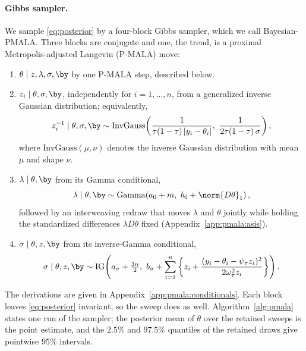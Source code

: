\paragraph{Gibbs sampler.} We sample \eqref{eq:posterior} by a four-block Gibbs sampler, which we call Bayesian-PMALA. Three blocks are conjugate and one, the trend, is a proximal Metropolis-adjusted Langevin (P-MALA) move:
\begin{enumerate}
    \item $\theta \mid z, \lambda, \sigma, \by$ by one P-MALA step, described below.
    \item $z_i \mid \theta, \sigma, \by$, independently for $i = 1, \ldots, n$, from a generalized inverse Gaussian distribution; equivalently,
    \begin{equation}
        z_i^{-1} \mid \theta, \sigma, \by \sim \mathrm{InvGauss}\!\left(\frac{1}{\tau(1-\tau)\,|y_i - \theta_i|},\ \frac{1}{2\tau(1-\tau)\,\sigma}\right),
        \label{eq:zupdate}
    \end{equation}
    where $\mathrm{InvGauss}(\mu, \nu)$ denotes the inverse Gaussian distribution with mean $\mu$ and shape $\nu$.
    \item $\lambda \mid \theta, \by$ from its Gamma conditional,
    \begin{equation}
        \lambda \mid \theta, \by \sim \mathrm{Gamma}\!\left(a_0 + m,\ b_0 + \norm{D\theta}_1\right),
        \label{eq:lambdaupdate}
    \end{equation}
    followed by an interweaving redraw that moves $\lambda$ and $\theta$ jointly while holding the standardized differences $\lambda D\theta$ fixed (Appendix~\ref{app:pmala:asis}).
    \item $\sigma \mid \theta, z, \by$ from its inverse-Gamma conditional,
    \begin{equation}
        \sigma \mid \theta, z, \by \sim \mathrm{IG}\!\left(a_\sigma + \tfrac{3n}{2},\ b_\sigma + \sum_{i=1}^n \left\{ z_i + \frac{(y_i - \theta_i - \psi_\tau z_i)^2}{2\omega_\tau^2 z_i}\right\}\right).
        \label{eq:sigmaupdate}
    \end{equation}
\end{enumerate}
The derivations are given in Appendix~\ref{app:pmala:conditionals}. Each block leaves \eqref{eq:posterior} invariant, so the sweep does as well. Algorithm~\ref{alg:pmala} states one run of the sampler; the posterior mean of $\theta$ over the retained sweeps is the point estimate, and the $2.5\%$ and $97.5\%$ quantiles of the retained draws give pointwise $95\%$ intervals.

